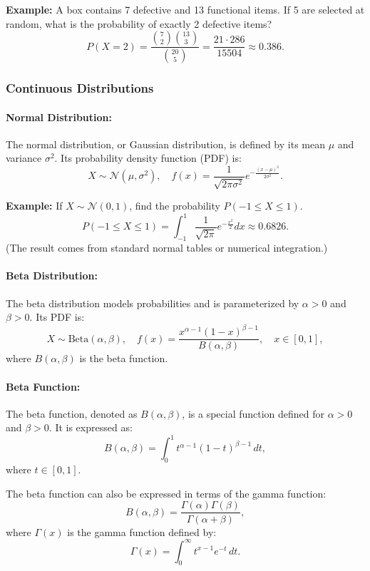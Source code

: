\documentclass[12pt,a4paper]{article}
\begin{document}
\textbf{Example:} A box contains 7 defective and 13 functional items. If 5 are selected at random, what is the probability of exactly 2 defective items?
\[
P(X = 2) = \frac{\binom{7}{2} \binom{13}{3}}{\binom{20}{5}} = \frac{21 \cdot 286}{15504} \approx 0.386.
\]

\subsubsection{Continuous Distributions}

\paragraph{Normal Distribution:}
The normal distribution, or Gaussian distribution, is defined by its mean \(\mu\) and variance \(\sigma^2\). Its probability density function (PDF) is:
\[
X \sim \mathcal{N}(\mu, \sigma^2), \quad f(x) = \frac{1}{\sqrt{2\pi\sigma^2}} e^{-\frac{(x-\mu)^2}{2\sigma^2}}.
\]

\textbf{Example:} If \(X \sim \mathcal{N}(0, 1)\), find the probability \(P(-1 \leq X \leq 1)\).
\[
P(-1 \leq X \leq 1) = \int_{-1}^1 \frac{1}{\sqrt{2\pi}} e^{-\frac{x^2}{2}} dx \approx 0.6826.
\]
(The result comes from standard normal tables or numerical integration.)

\paragraph{Beta Distribution:}
The beta distribution models probabilities and is parameterized by \(\alpha > 0\) and \(\beta > 0\). Its PDF is:
\[
X \sim \text{Beta}(\alpha, \beta), \quad f(x) = \frac{x^{\alpha-1} (1-x)^{\beta-1}}{B(\alpha, \beta)}, \quad x \in [0, 1],
\]
where \(B(\alpha, \beta)\) is the beta function.
\paragraph{Beta Function:}
The beta function, denoted as \( B(\alpha, \beta) \), is a special function defined for \(\alpha > 0\) and \(\beta > 0\). It is expressed as:
\[
B(\alpha, \beta) = \int_0^1 t^{\alpha - 1} (1 - t)^{\beta - 1} \, dt,
\]
where \( t \in [0, 1] \).

The beta function can also be expressed in terms of the gamma function:
\[
B(\alpha, \beta) = \frac{\Gamma(\alpha) \Gamma(\beta)}{\Gamma(\alpha + \beta)},
\]
where \(\Gamma(x)\) is the gamma function defined by:
\[
\Gamma(x) = \int_0^\infty t^{x-1} e^{-t} \, dt.
\]
\end{document}
